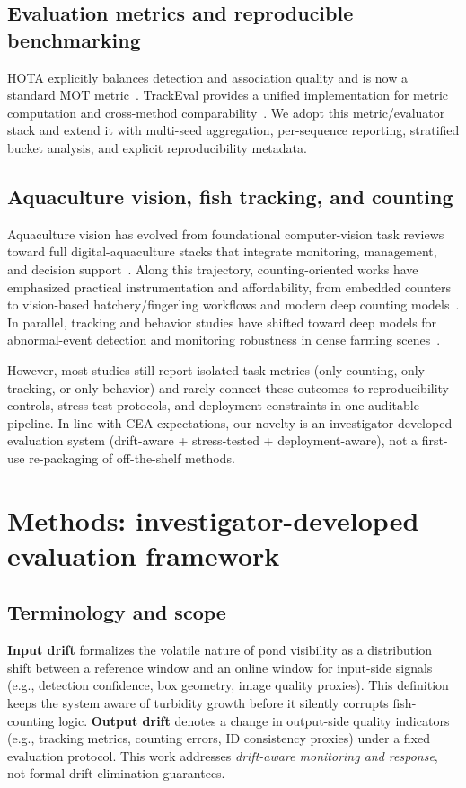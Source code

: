 \documentclass[5p,twocolumn,a4paper]{elsarticle}
\begin{document}
\subsection{Evaluation metrics and reproducible benchmarking}
HOTA explicitly balances detection and association quality and is now a standard MOT metric~\cite{hota2020}. TrackEval provides a unified implementation for metric computation and cross-method comparability~\cite{trackeval2020}. We adopt this metric/evaluator stack and extend it with multi-seed aggregation, per-sequence reporting, stratified bucket analysis, and explicit reproducibility metadata.

\subsection{Aquaculture vision, fish tracking, and counting}
Aquaculture vision has evolved from foundational computer-vision task reviews toward full digital-aquaculture stacks that integrate monitoring, management, and decision support~\cite{zion2012,fore2018,zhou2018feeding,li2020biomass,barbedo2022review,cui2025survey}. Along this trajectory, counting-oriented works have emphasized practical instrumentation and affordability, from embedded counters to vision-based hatchery/fingerling workflows and modern deep counting models~\cite{hernandez2018counter,albuquerque2019fingerlings,zhang2020fishcount}. In parallel, tracking and behavior studies have shifted toward deep models for abnormal-event detection and monitoring robustness in dense farming scenes~\cite{mei2022trackingreview,wang2022abnormal,zhao2024stereo}. 

However, most studies still report isolated task metrics (only counting, only tracking, or only behavior) and rarely connect these outcomes to reproducibility controls, stress-test protocols, and deployment constraints in one auditable pipeline. In line with CEA expectations, our novelty is an investigator-developed evaluation system (drift-aware + stress-tested + deployment-aware), not a first-use re-packaging of off-the-shelf methods.

\section{Methods: investigator-developed evaluation framework}
\subsection{Terminology and scope}
\textbf{Input drift} formalizes the volatile nature of pond visibility as a distribution shift between a reference window and an online window for input-side signals (e.g., detection confidence, box geometry, image quality proxies). This definition keeps the system aware of turbidity growth before it silently corrupts fish-counting logic. \textbf{Output drift} denotes a change in output-side quality indicators (e.g., tracking metrics, counting errors, ID consistency proxies) under a fixed evaluation protocol. This work addresses \emph{drift-aware monitoring and response}, not formal drift elimination guarantees.
\end{document}
